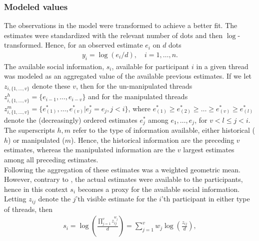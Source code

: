 \documentclass[9pt,a4paper,twocolumn,lineno]{article}
\begin{document}
\subsubsection*{Modeled values}
The observations in the model were transformed to achieve a better fit. The estimates were standardized with the relevant number of dots and then $\log$-transformed. Hence, for an observed estimate $e_i$ on $d$ dots
\begin{align*}
	y_i = \log(e_i/d), \quad i=1,\dots,n.
\end{align*}
The available social information, $s_i$, available for participant $i$ in a given thread was modeled as an aggregated value of the available previous estimates. If we let $z_{i,\{1,\dots,v\}}$ denote these $v$, then for the un-manipulated threads $z^h_{i, \{1,\dots,v\}} = \{e_{i-1},\dots,e_{i-v}\}$ and for the manipulated threads $z^m_{i, \{1,\dots,v\}} = \{e^*_{(1)},\dots,e^*_{(v)} | e^*_j=e_j, j<i\}$, where $e^*_{(1)}\geq e^*_{(2)}\geq\dots\geq e^*_{(v)}\geq e^*_{(l)}$ denote the (decreasingly) ordered estimates $e^*_j$ among $e_1,\dots,e_j$, for $v<l\leq j<i$. The superscripts $h,m$ refer to the type of information available, either historical ($h$) or manipulated ($m$). Hence, the historical information are the preceding $v$ estimates, whereas the manipulated information are the $v$ largest estimates among all preceding estimates. \\
Following \citep{jayles2017social} the aggregation of these estimates was a weighted geometric mean. However, contrary to \citep{jayles2017social}, the actual estimates were available to the participants, hence in this context $s_i$ becomes a proxy for the available social information. Letting $z_{ij}$ denote the $j$'th visible estimate for the $i$'th participant in either type of threads, then
\begin{align*}
	s_i = \log\left(\frac{\prod_{j=1}^v z_{ij}^{w_j}}{d}\right) %
	= \sum_{j=1}^v w_j \log\left(\frac{z_{ij}}{d}\right),
\end{align*}
\end{document}
